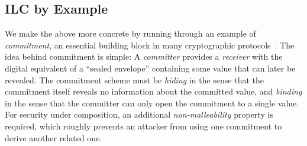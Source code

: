 \subsection{ILC by Example}
\label{subsec:ilc-flavored}

We make the above more concrete by running through an example of
\emph{commitment}, an essential building block in many cryptographic
protocols~\cite{brassard1988minimum}. The idea behind commitment is simple: A
\emph{committer} provides a \emph{receiver} with the digital equivalent of a
``sealed envelope'' containing some value that can later be
revealed.
The commitment scheme must be \emph{hiding} in the sense that the commitment itself
reveals no information about the committed value, and \emph{binding} in the sense
that the committer can only open the commitment to a single value.
For security under composition, an additional \emph{non-malleability} property is required,
which roughly prevents an attacker from using one commitment to derive another related one.
%
%

